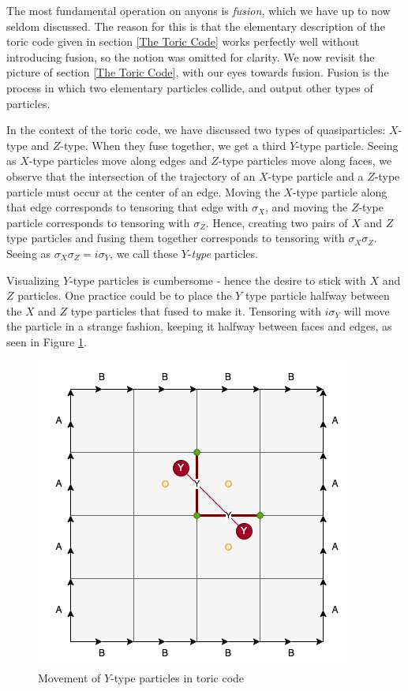 \documentclass{article}
\theoremstyle{definition}
\numberwithin{figure}{section}
\begin{document}
The most fundamental operation on anyons is \textit{fusion}, which we have up to now seldom discussed. The reason for this is that the elementary description of the toric code given in section \ref{The Toric Code} works perfectly well without introducing fusion, so the notion was omitted for clarity. We now revisit the picture of section \ref{The Toric Code}, with our eyes towards fusion. Fusion is the process in which two elementary particles collide, and output other types of particles. 

In the context of the toric code, we have discussed two types of quasiparticles: $X$-type and $Z$-type. When they fuse together, we get a third $Y$-type particle. Seeing as $X$-type particles move along edges and $Z$-type particles move along faces, we observe that the intersection of the trajectory of an $X$-type particle and a $Z$-type particle must occur at the center of an edge. Moving the $X$-type particle along that edge corresponds to tensoring that edge with $\sigma_{X}$, and moving the $Z$-type particle corresponds to tensoring with $\sigma_{Z}$. Hence, creating two pairs of $X$ and $Z$ type particles and fusing them together corresponds to tensoring with $\sigma_X\sigma_Z$. Seeing as $\sigma_X\sigma_Z=i\sigma_Y$, we call these $Y$-\textit{type} particles.

Visualizing $Y$-type particles is cumbersome - hence the desire to stick with $X$ and $Z$ particles. One practice could be to place the $Y$ type particle halfway between the $X$ and $Z$ type particles that fused to make it. Tensoring with $i\sigma_Y$ will move the particle in a strange fashion, keeping it halfway between faces and edges, as seen in Figure \ref{fig:Y-type}.

\begin{figure}
\begin{center}
\includegraphics[scale=0.30]{Y-type}
\caption{Movement of $Y$-type particles in toric code}
\label{fig:Y-type}
\end{center}
\end{figure}
\end{document}
